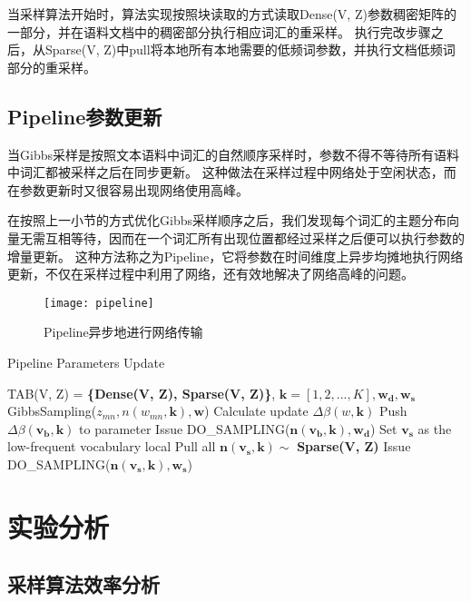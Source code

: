 当采样算法开始时，算法实现按照块读取的方式读取Dense(V, Z)参数稠密矩阵的一部分，并在语料文档中的稠密部分执行相应词汇的重采样。
执行完改步骤之后，从Sparse(V, Z)中pull将本地所有本地需要的低频词参数，并执行文档低频词部分的重采样。

\subsection{Pipeline参数更新}
当Gibbs采样是按照文本语料中词汇的自然顺序采样时，参数不得不等待所有语料中词汇都被采样之后在同步更新。
这种做法在采样过程中网络处于空闲状态，而在参数更新时又很容易出现网络使用高峰。

在按照上一小节的方式优化Gibbs采样顺序之后，我们发现每个词汇的主题分布向量无需互相等待，因而在一个词汇所有出现位置都经过采样之后便可以执行参数的增量更新。
这种方法称之为Pipeline，它将参数在时间维度上异步均摊地执行网络更新，不仅在采样过程中利用了网络，还有效地解决了网络高峰的问题。

\begin{figure}[htb]\centering
\texttt{[image: pipeline]}
\caption{Pipeline异步地进行网络传输}
\label{fig:pipeline}       %
\end{figure}


\begin{algorithm}[htb]
\caption{Pipeline Parameters Update} 
\label{alg:pipeline}
\begin{algorithmic}[1]
\Require TAB(V, Z) = \textbf{\{Dense(V, Z), Sparse(V, Z)\}}, $\mathbf{k} = [1, 2, ..., K], \mathbf{w_d, w_s}$
\State GibbsSampling($z_{mn}, n(w_{mn}, \mathbf{k}), \mathbf{w}$)
\State Calculate update $\Delta \beta(w, \mathbf{k})$
\EndFor
\State Push $\Delta \beta(\mathbf{v_b}, \mathbf{k})$ to parameter
\EndFunction
{}
\State Issue DO\_SAMPLING($\mathbf{n(v_b, k), w_d}$)
\EndFor
\State Set $\mathbf{v_s}$ as the low-frequent vocabulary local
\State Pull all $\mathbf{n(v_s, k)} \sim $ \textbf{Sparse(V, Z)}
\State Issue DO\_SAMPLING($\mathbf{n(v_s, k), w_s}$)
\end{algorithmic}  
\end{algorithm}  

\section{实验分析}
\subsection{采样算法效率分析}

